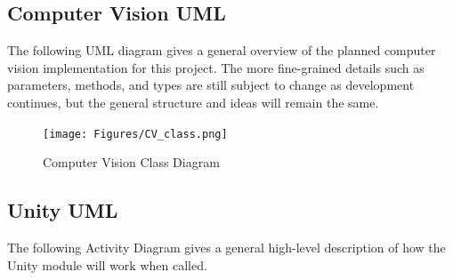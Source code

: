\documentclass[12pt]{article}
\begin{document}
\subsection{Computer Vision UML}\label{computer-vision-uml}

The following UML diagram gives a general overview of the planned
computer vision implementation for this project. The more fine-grained
details such as parameters, methods, and types are still subject to
change as development continues, but the general structure and ideas
will remain the same.

\begin{figure}
\centering
\texttt{[image: Figures/CV\_class.png]}
\caption{Computer Vision Class Diagram}
\end{figure}

\subsection{Unity UML}\label{unity-uml}

The following Activity Diagram gives a general high-level description of
how the Unity module will work when called.
\end{document}
